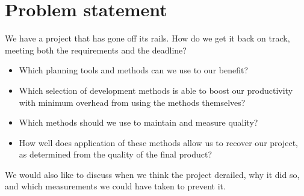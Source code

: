 \section{Problem statement}
We have a project that has gone off its rails. How do we get it back on track, meeting both the requirements and the deadline?
\begin{itemize}
\item Which planning tools and methods can we use to our benefit?
\item Which selection of development methods is able to boost our productivity with minimum overhead from using the methods themselves?
\item Which methods should we use to maintain and measure quality?
\item How well does application of these methods allow us to recover our project, as determined from the quality of the final product?
\end{itemize}
We would also like to discuss when we think the project derailed, why it did so, and which measurements we could have taken to prevent it.
\newpage